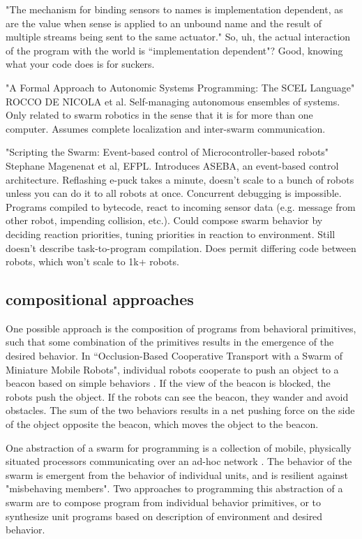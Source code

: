 \documentclass[]{article}
\begin{document}
"The mechanism for binding sensors to names is implementation dependent, as are the value when sense is applied to an unbound name and the result of multiple streams being sent to the same actuator." So, uh, the actual interaction of the program with the world is ``implementation dependent"? Good, knowing what your code does is for suckers. 

"A Formal Approach to Autonomic Systems Programming: The SCEL Language" \cite{nicola2014formal} ROCCO DE NICOLA et al. Self-managing autonomous ensembles of systems. Only related to swarm robotics in the sense that it is for more than one computer. Assumes complete localization and inter-swarm communication. 

"Scripting the Swarm: Event-based control of Microcontroller-based robots" \cite{magnenat2008scripting} Stephane Magenenat et al, EFPL. Introduces ASEBA, an event-based control architecture. Reflashing e-puck takes a minute, doesn't scale to a bunch of robots unless you can do it to all robots at once. Concurrent debugging is impossible. Programs compiled to bytecode, react to incoming sensor data (e.g. message from other robot, impending collision, etc.). Could compose swarm behavior by deciding reaction priorities, tuning priorities in reaction to environment. Still doesn't describe task-to-program compilation. Does permit differing code between robots, which won't scale to 1k+ robots.

\subsection{compositional approaches}

One possible approach is the composition of programs from behavioral primitives, such that some combination of the primitives results in the emergence of the desired behavior. 
In ``Occlusion-Based Cooperative Transport with a Swarm of Miniature Mobile Robots", individual robots cooperate to push an object to a beacon based on simple behaviors \cite{chen2015occlusion}. 
If the view of the beacon is blocked, the robots push the object. 
If the robots can see the beacon, they wander and avoid obstacles. 
The sum of the two behaviors results in a net pushing force on the side of the object opposite the beacon, which moves the object to the beacon. 

One abstraction of a swarm for programming is a collection of mobile, physically situated processors communicating over an ad-hoc network \cite{evans2000programming}. The behavior of the swarm is emergent from the behavior of individual units, and is  resilient against "misbehaving members".
Two approaches to programming this abstraction of a swarm are to compose program from individual behavior primitives, or to synthesize unit programs based on description of environment and desired behavior. 
\end{document}
